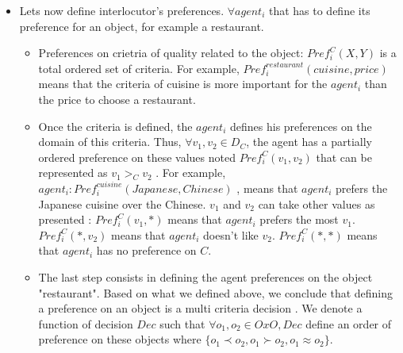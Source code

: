 \documentclass{llncs}
\begin{document}
\begin{itemize}
 \item Lets now define interlocutor's preferences. $\forall agent_{i}$ that has to define its preference for an object, for example a restaurant.
 \begin{itemize}
 \item Preferences on crietria of quality related to the object: $Pref_{i}^C (X,Y) $ is a total ordered set of criteria. For example, $ Pref_{i}^{restaurant} (cuisine,price)$ means that the criteria of cuisine is more important for the $agent_{i}$  than the price to choose a restaurant. 
 \item Once the criteria is defined, the $agent_{i}$ defines his preferences on the domain of this criteria. Thus, $\forall v_{1} , v_{2} \in D_{C}$, the agent has a  partially ordered preference on these values noted $Pref_{i}^C (v_{1}, v_{2})$  that can be represented as $v_{1}>_{C} v_{2}$ . For example, $agent_{i}:  Pref_{i}^{cuisine} (Japanese , Chinese)$ , means that  $agent_{i}$ prefers the Japanese cuisine over the Chinese. $v_{1} $ and $ v_{2}$ can take other values as presented : 
 \subitem $Pref_{i}^C (v_{1}, *)$ means that $agent_{i}$ prefers the most $v_{1}$. 
  \subitem $Pref_{i}^C (*,v_{2})$ means that $agent_{i}$ doesn't like  $v_{2}$. 
  \subitem $Pref_{i}^C (*,*)$ means that $agent_{i}$ has no preference on $C$. 
 \subitem
 \item The last step consists in defining the agent preferences on the object "restaurant". Based on what we defined above, we conclude that defining a preference on an object is a multi criteria decision \cite{figueira2005multiple}. We denote a function of decision  $Dec$ such that $\forall o_{1}, o_{2} \in O x O, Dec$ define an order of preference on these objects where  $\{o_{1}\prec o_{2}, o_{1} \succ o_{2}, o_{1} \approx o_{2}\}$.

 \end{itemize} 
 \end{itemize}
\end{document}

